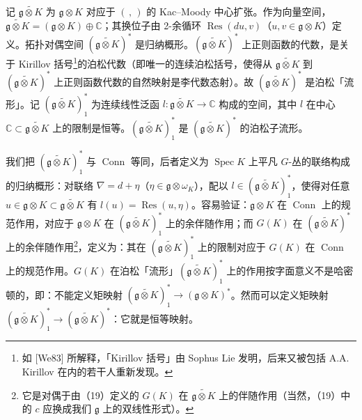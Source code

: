 记 $\widetilde{\mathfrak{g}\otimes K}$ 为 $\mathfrak{g}\otimes K$ 对应于 $(\,,\,)$ 的 Kac--Moody 中心扩张。作为向量空间，$\widetilde{\mathfrak{g}\otimes K}=(\mathfrak{g}\otimes K)\oplus\mathbb{C}$；其换位子由 2-余循环 $\operatorname{Res}(du,v)$（$u,v\in\mathfrak{g}\otimes K$）定义。拓扑对偶空间 $(\widetilde{\mathfrak{g}\otimes K})^*$ 是归纳概形。$(\widetilde{\mathfrak{g}\otimes K})^*$ 上正则函数的代数，是关于 Kirillov 括号\footnote{如 [We83] 所解释，「Kirillov 括号」由 Sophus Lie 发明，后来又被包括 A.A. Kirillov 在内的若干人重新发现。}的泊松代数（即唯一的连续泊松括号，使得从 $\widetilde{\mathfrak{g}\otimes K}$ 到 $(\widetilde{\mathfrak{g}\otimes K})^*$ 上正则函数代数的自然映射是李代数态射）。故 $(\widetilde{\mathfrak{g}\otimes K})^*$ 是泊松「流形」。记 $(\widetilde{\mathfrak{g}\otimes K})^*_1$ 为连续线性泛函 $l:\widetilde{\mathfrak{g}\otimes K}\to\mathbb{C}$ 构成的空间，其中 $l$ 在中心 $\mathbb{C}\subset\widetilde{\mathfrak{g}\otimes K}$ 上的限制是恒等。$(\widetilde{\mathfrak{g}\otimes K})^*_1$ 是 $(\widetilde{\mathfrak{g}\otimes K})^*$ 的泊松子流形。

我们把 $(\widetilde{\mathfrak{g}\otimes K})^*_1$ 与 $\operatorname{Conn}$ 等同，后者定义为 $\operatorname{Spec}K$ 上平凡 $G$-丛的联络构成的归纳概形：对联络 $\nabla=d+\eta$（$\eta\in\mathfrak{g}\otimes\omega_K$），配以 $l\in(\widetilde{\mathfrak{g}\otimes K})^*_1$，使得对任意 $u\in\mathfrak{g}\otimes K\subset\widetilde{\mathfrak{g}\otimes K}$ 有 $l(u)=\operatorname{Res}(u,\eta)$。容易验证：$\mathfrak{g}\otimes K$ 在 $\operatorname{Conn}$ 上的规范作用，对应于 $\mathfrak{g}\otimes K$ 在 $(\widetilde{\mathfrak{g}\otimes K})^*_1$ 上的余伴随作用；而 $G(K)$ 在 $(\widetilde{\mathfrak{g}\otimes K})^*$ 上的余伴随作用\footnote{它是对偶于由（19）定义的 $G(K)$ 在 $\widetilde{\mathfrak{g}\otimes K}$ 上的伴随作用（当然，（19）中的 $c$ 应换成我们 $\mathfrak{g}$ 上的双线性形式）。}，定义为：其在 $(\widetilde{\mathfrak{g}\otimes K})^*_1$ 上的限制对应于 $G(K)$ 在 $\operatorname{Conn}$ 上的规范作用。$G(K)$ 在泊松「流形」$(\widetilde{\mathfrak{g}\otimes K})^*_1$ 上的作用按字面意义不是哈密顿的，即：不能定义矩映射 $(\widetilde{\mathfrak{g}\otimes K})^*_1\to(\mathfrak{g}\otimes K)^*$。然而可以定义矩映射 $(\widetilde{\mathfrak{g}\otimes K})^*_1\to(\widetilde{\mathfrak{g}\otimes K})^*$：它就是恒等映射。


